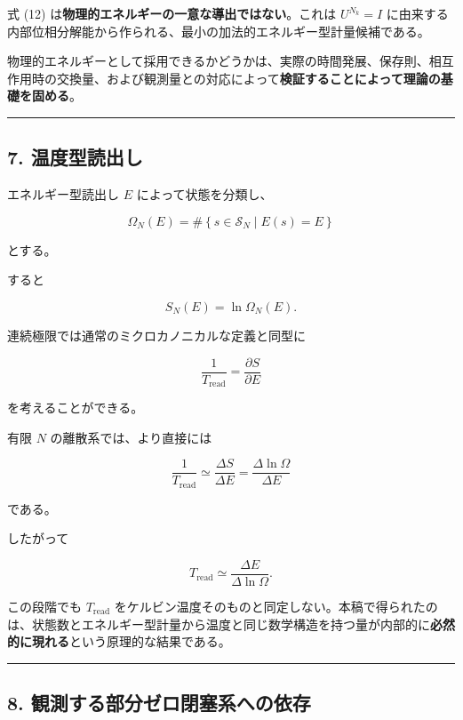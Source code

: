\documentclass[
  a4paper,
]{ltjsarticle}
\begin{document}
式 (12) は\textbf{物理的エネルギーの一意な導出ではない}。これは
\(U^{N_k}=I\)
に由来する内部位相分解能から作られる、最小の加法的エネルギー型計量候補である。

物理的エネルギーとして採用できるかどうかは、実際の時間発展、保存則、相互作用時の交換量、および観測量との対応によって\textbf{検証することによって理論の基礎を固める}。

\begin{center}\rule{0.5\linewidth}{0.5pt}\end{center}

\subsection{7. 温度型読出し}\label{ux6e29ux5ea6ux578bux8aadux51faux3057}

エネルギー型読出し \(E\) によって状態を分類し、

\[
\Omega_N(E)
=
\#\left\{
s\in\mathcal{S}_N
\mid
E(s)=E
\right\}
\tag{13}
\]

とする。

すると

\[
S_N(E)
=
\ln\Omega_N(E).
\tag{14}
\]

連続極限では通常のミクロカノニカルな定義と同型に

\[
\frac{1}{T_{\mathrm{read}}}
=
\frac{\partial S}{\partial E}
\tag{15}
\]

を考えることができる。

有限 \(N\) の離散系では、より直接には

\[
\frac{1}{T_{\mathrm{read}}}
\simeq
\frac{\Delta S}{\Delta E}
=
\frac{\Delta\ln\Omega}{\Delta E}
\tag{16}
\]

である。

したがって

\[
T_{\mathrm{read}}
\simeq
\frac{\Delta E}{\Delta\ln\Omega}.
\tag{17}
\]

この段階でも \(T_{\mathrm{read}}\)
をケルビン温度そのものと同定しない。本稿で得られたのは、状態数とエネルギー型計量から温度と同じ数学構造を持つ量が内部的に\textbf{必然的に現れる}という原理的な結果である。

\begin{center}\rule{0.5\linewidth}{0.5pt}\end{center}

\subsection{8.
観測する部分ゼロ閉塞系への依存}\label{ux89b3ux6e2cux3059ux308bux90e8ux5206ux30bcux30edux9589ux585eux7cfbux3078ux306eux4f9dux5b58}
\end{document}

